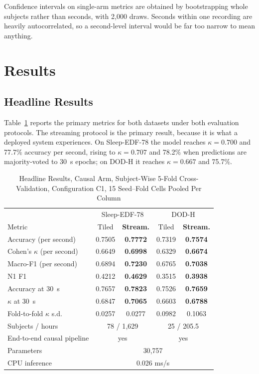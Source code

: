 \documentclass[conference]{IEEEtran}
\begin{document}
Confidence intervals on single-arm metrics are obtained by bootstrapping whole subjects rather than
seconds, with 2{,}000 draws. Seconds within one recording are heavily autocorrelated, so a
second-level interval would be far too narrow to mean anything.

\section{Results}

\subsection{Headline Results}

Table~\ref{tab:headline} reports the primary metrics for both datasets under both evaluation
protocols. The streaming protocol is the primary result, because it is what a deployed system
experiences. On Sleep-EDF-78 the model reaches $\kappa = 0.700$ and 77.7\% accuracy per second,
rising to $\kappa = 0.707$ and 78.2\% when predictions are majority-voted to 30~s epochs; on DOD-H
it reaches $\kappa = 0.667$ and 75.7\%.

\begin{table}[t]
\caption{Headline Results, Causal Arm, Subject-Wise 5-Fold Cross-Validation, Configuration C1, 15
Seed--Fold Cells Pooled Per Column}
\label{tab:headline}
\centering
\footnotesize
\setlength{\tabcolsep}{4pt}
\begin{tabular}{lcc|cc}
\toprule
 & \multicolumn{2}{c|}{Sleep-EDF-78} & \multicolumn{2}{c}{DOD-H} \\
Metric & Tiled & \textbf{Stream.} & Tiled & \textbf{Stream.} \\
\midrule
Accuracy (per second)         & 0.7505 & \textbf{0.7772} & 0.7319 & \textbf{0.7574} \\
Cohen's $\kappa$ (per second) & 0.6649 & \textbf{0.6998} & 0.6329 & \textbf{0.6674} \\
Macro-F1 (per second)         & 0.6894 & \textbf{0.7230} & 0.6765 & \textbf{0.7038} \\
N1 F1                         & 0.4212 & \textbf{0.4629} & 0.3515 & \textbf{0.3938} \\
Accuracy at 30~s              & 0.7657 & \textbf{0.7823} & 0.7526 & \textbf{0.7659} \\
$\kappa$ at 30~s              & 0.6847 & \textbf{0.7065} & 0.6603 & \textbf{0.6788} \\
Fold-to-fold $\kappa$ s.d.    & 0.0257 & 0.0277 & 0.0982 & 0.1063 \\
\midrule
Subjects / hours & \multicolumn{2}{c|}{78 / 1{,}629} & \multicolumn{2}{c}{25 / 205.5} \\
End-to-end causal pipeline & \multicolumn{2}{c|}{yes} & \multicolumn{2}{c}{yes} \\
Parameters & \multicolumn{4}{c}{30{,}757} \\
CPU inference & \multicolumn{4}{c}{0.026 ms/s} \\
\bottomrule
\end{tabular}
\end{table}
\end{document}
